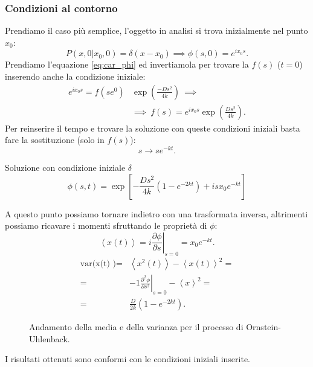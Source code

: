 \subsubsection{Condizioni al contorno}%
\label{subsub:Condizioni al contorno}
Prendiamo il caso più semplice, l'oggetto in analisi si trova inizialmente nel punto $x_0$:
\[
    P(x,0|x_0,0) = \delta (x-x_0) \implies  \phi (s,0) = e^{ix_0s}
.\] 
Prendiamo l'equazione \ref{eq:car_phi} ed invertiamola per trovare la $f(s)$ ($t=0$) inserendo anche la condizione iniziale:
\[\begin{aligned}
    e^{ix_0s} = f(s e^0) &\exp\left(\frac{-Ds^2}{4k}\right) \ \implies \\
			 &\implies  \ f(s) = e^{ix_0s}\exp\left(\frac{Ds^2}{4k}\right)
.\end{aligned}\]
Per reinserire il tempo e trovare la soluzione con queste condizioni iniziali basta fare la sostituzione (solo in $f(s)$):
\[
    s \to se^{-kt}
.\] 
\begin{redbox}{Soluzione con condizione iniziale $\delta$}
    \begin{equation}
	\phi(s,t) =
	\exp\left[-\frac{Ds^2}{4k}\left(1-e^{-2kt}\right) + isx_0e^{-kt}\right]
    \end{equation}
\end{redbox}
\noindent
A questo punto possiamo tornare indietro con una trasformata inversa, altrimenti possiamo ricavare i momenti sfruttando le proprietà di $\phi$:
\[
    \left<x(t)\right> = \left.i\frac{\partial \phi}{\partial s} \right|_{s=0} = x_0e^{-kt}
.\] 
\[\begin{aligned}
    \text{var(x(t) )} =& \left<x^2(t)\right> - \left<x(t)\right>^2 = \\
    =& \left.-1 \frac{\partial ^2\phi}{\partial s^2}\right|_{s=0} - \left<x\right>^2 = \\
    =&\frac{D}{2k}\left(1-e^{-2kt}\right)
.\end{aligned}\]

\begin{figure}[H]
    \centering
    \caption{\scriptsize Andamento della media e della varianza per il processo di Ornstein-Uhlenback.}
    \label{fig:mean-var}
\end{figure}
\noindent
I risultati ottenuti sono conformi con le condizioni iniziali inserite. 
